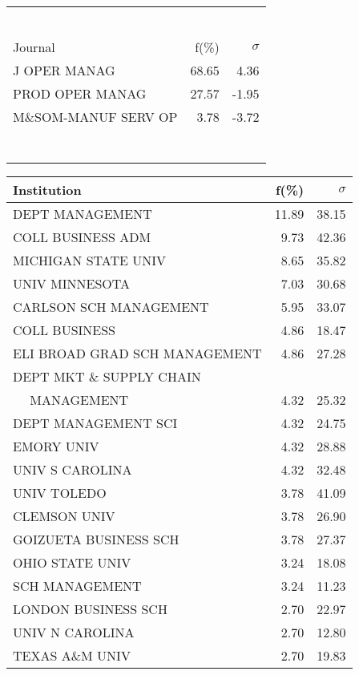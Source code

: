 \documentclass[a4paper,11pt]{report}
\begin{document}
\begin{landscape}
\begin{table}[!ht]
{\begin{tabular}{|l r r|}
 &  & \\
 &  & \\
 &  & \\
 &  & \\
 &  & \\
 &  & \\
\hline
\hline
Journal & f(\%) & $\sigma$\\
\hline
J OPER MANAG & 68.65 & 4.36\\
PROD OPER MANAG & 27.57 & -1.95\\
M\&SOM-MANUF SERV OP & 3.78 & -3.72\\
 &  & \\
 &  & \\
 &  & \\
 &  & \\
 &  & \\
 &  & \\
 &  & \\
\hline
\end{tabular}
}
{\scriptsize\begin{tabular}{|l r r|}
\hline
Institution & f(\%) & $\sigma$\\
\hline
DEPT MANAGEMENT & 11.89 & 38.15\\
COLL BUSINESS ADM & 9.73 & 42.36\\
MICHIGAN STATE UNIV & 8.65 & 35.82\\
UNIV MINNESOTA & 7.03 & 30.68\\
CARLSON SCH MANAGEMENT & 5.95 & 33.07\\
COLL BUSINESS & 4.86 & 18.47\\
ELI BROAD GRAD SCH MANAGEMENT & 4.86 & 27.28\\
DEPT MKT \& SUPPLY CHAIN &  & \\
$\quad$ MANAGEMENT & 4.32 & 25.32\\
DEPT MANAGEMENT SCI & 4.32 & 24.75\\
EMORY UNIV & 4.32 & 28.88\\
UNIV S CAROLINA & 4.32 & 32.48\\
UNIV TOLEDO & 3.78 & 41.09\\
CLEMSON UNIV & 3.78 & 26.90\\
GOIZUETA BUSINESS SCH & 3.78 & 27.37\\
OHIO STATE UNIV & 3.24 & 18.08\\
SCH MANAGEMENT & 3.24 & 11.23\\
LONDON BUSINESS SCH & 2.70 & 22.97\\
UNIV N CAROLINA & 2.70 & 12.80\\
TEXAS A\&M UNIV & 2.70 & 19.83\\

\end{tabular}}
\end{table}
\end{landscape}
\end{document}

